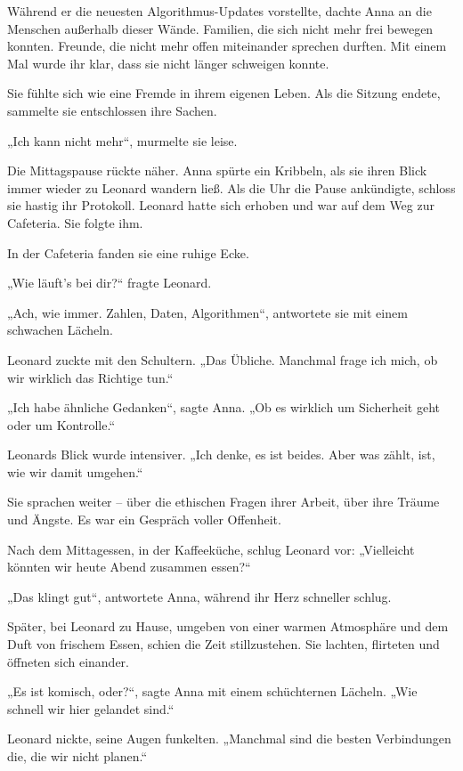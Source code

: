 \documentclass[
]{article}
\begin{document}
Während er die neuesten Algorithmus-Updates vorstellte, dachte Anna an die Menschen außerhalb dieser Wände. Familien, die sich nicht mehr frei bewegen konnten. Freunde, die nicht mehr offen miteinander sprechen durften. Mit einem Mal wurde ihr klar, dass sie nicht länger schweigen konnte.

Sie fühlte sich wie eine Fremde in ihrem eigenen Leben. Als die Sitzung endete, sammelte sie entschlossen ihre Sachen.

„Ich kann nicht mehr``, murmelte sie leise.

Die Mittagspause rückte näher. Anna spürte ein Kribbeln, als sie ihren Blick immer wieder zu Leonard wandern ließ. Als die Uhr die Pause ankündigte, schloss sie hastig ihr Protokoll. Leonard hatte sich erhoben und war auf dem Weg zur Cafeteria. Sie folgte ihm.

In der Cafeteria fanden sie eine ruhige Ecke.

„Wie läuft's bei dir?{\kern0pt}`` fragte Leonard.

„Ach, wie immer. Zahlen, Daten, Algorithmen``, antwortete sie mit einem schwachen Lächeln.

Leonard zuckte mit den Schultern. „Das Übliche. Manchmal frage ich mich, ob wir wirklich das Richtige tun.``

„Ich habe ähnliche Gedanken``, sagte Anna. „Ob es wirklich um Sicherheit geht oder um Kontrolle.``

Leonards Blick wurde intensiver. „Ich denke, es ist beides. Aber was zählt, ist, wie wir damit umgehen.``

Sie sprachen weiter -- über die ethischen Fragen ihrer Arbeit, über ihre Träume und Ängste. Es war ein Gespräch voller Offenheit.

Nach dem Mittagessen, in der Kaffeeküche, schlug Leonard vor: „Vielleicht könnten wir heute Abend zusammen essen?{\kern0pt}``

„Das klingt gut``, antwortete Anna, während ihr Herz schneller schlug.

Später, bei Leonard zu Hause, umgeben von einer warmen Atmosphäre und dem Duft von frischem Essen, schien die Zeit stillzustehen. Sie lachten, flirteten und öffneten sich einander.

„Es ist komisch, oder?{\kern0pt}``, sagte Anna mit einem schüchternen Lächeln. „Wie schnell wir hier gelandet sind.``

Leonard nickte, seine Augen funkelten. „Manchmal sind die besten Verbindungen die, die wir nicht planen.``
\end{document}

